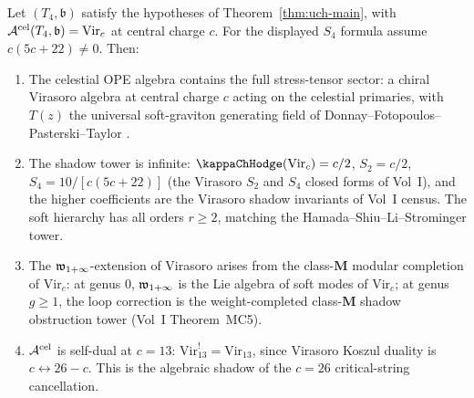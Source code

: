 \begin{proposition}
\label{prop:uch-celestial-virasoro}
Let $(T_4,\mathfrak b)$ satisfy the hypotheses of
Theorem~\ref{thm:uch-main}, with
$\mathcal A^{\mathrm{cel}}(T_4,\mathfrak b) = \mathrm{Vir}_c$ at central
charge $c$. For the displayed $S_4$ formula assume
$c(5c+22)\ne0$.
Then:
\begin{enumerate}[label=\textup{(\roman*)}]
\item The celestial OPE algebra contains the full stress-tensor
sector: a chiral Virasoro algebra at central charge $c$ acting on
the celestial primaries, with $T(z)$ the universal soft-graviton
generating field of Donnay--Fotopoulos--Pasterski--Taylor
\cite{DonnayFotopoulosPasterskiTaylor21,DonnayFotopoulosPasterskiTaylor22}.
\item The shadow tower is infinite: $\kap(\mathrm{Vir}_c) = c/2$,
$S_2 = c/2$, $S_4 = 10/[c(5c + 22)]$ (the Virasoro $S_2$ and
$S_4$ closed forms of Vol~I), and the higher
coefficients are the Virasoro shadow invariants of Vol~I census. The
soft hierarchy has all orders $r \geq 2$, matching the
Hamada--Shiu--Li--Strominger tower.
\item The $\mathfrak w_{1+\infty}$-extension of Virasoro arises from the class-$\mathbf M$
modular completion of $\mathrm{Vir}_c$: at genus $0$, $\mathfrak w_{1+\infty}$ is the
Lie algebra of soft modes of $\mathrm{Vir}_c$; at genus $g \geq 1$,
the loop correction is the weight-completed class-$\mathbf M$
shadow obstruction tower (Vol~I Theorem~MC5).
\item $\mathcal A^{\mathrm{cel}}$ is self-dual at $c = 13$:
$\mathrm{Vir}_{13}^{!} = \mathrm{Vir}_{13}$, since Virasoro Koszul
duality is $c \leftrightarrow 26 - c$. This is the algebraic shadow
of the
$c = 26$ critical-string cancellation.
\end{enumerate}
\end{proposition}

